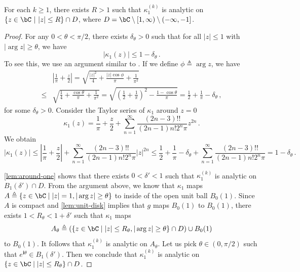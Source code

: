 \documentclass[11pt]{article}
\newcommand{\g}{\kappa_1}
\renewcommand{\i}{\mathbf{i}}
\begin{document}
\begin{lemma}\label{lem:analytic}
  
For each $k\geq 1$, there exists $R>1$ such that $\g^{(k)}$ is analytic on $\{z\in \bC~|~ |z|\le R\}\cap D$, where $D = \bC\setminus [1,\infty) \setminus (-\infty,-1] $.  
\end{lemma}

\begin{proof}
For any $0<\theta < \pi/2$, there exists $\delta_\theta>0$ such that for all $|z|\le 1$ with $|\arg z| \ge \theta$, we have \[
|\g(z)| \le 1 - \delta_\theta\,.
\]
To see this, we use an argument similar to \citep{pinelis}.
If 
we define $\phi \triangleq \arg z$, we have \begin{align*}
& \left| \frac{1}{\pi} + \frac{z}{2} \right| 
= \sqrt{\frac{|z|^2}{4}+\frac{|z| \cos \phi }{\pi }+\frac{1}{\pi ^2}}\\
\le{}& \sqrt{\frac{1}{4}+\frac{ \cos \theta}{\pi }+\frac{1}{\pi ^2}}
= \sqrt{\left(\frac{1}{2} + \frac{1}{\pi}\right)^2-\frac{1-\cos \theta}{\pi}}
= \frac{1}{2} + \frac{1}{\pi} - \delta_{\theta}
\,,
\end{align*}
for some $\delta_\theta>0$. 
Consider the Taylor series of $\g$ around $z=0$
\[
\g(z) = \frac{1}{\pi} + \frac{z}{2} + \sum_{n=1}^\infty \frac{(2n-3)!!}{(2n-1)n!2^n \pi} z^{2n}\,.
\]
We obtain \[
|\g(z)| \le \left|\frac{1}{\pi} + \frac{z}{2} \right| + \sum_{n=1}^\infty \frac{(2n-3)!!}{(2n-1)n!2^n \pi} |z|^{2n} \le \frac{1}{2} + \frac{1}{\pi}-\delta_\theta + \sum_{n=1}^\infty \frac{(2n-3)!!}{(2n-1)n!2^n \pi} = 1 - \delta_\theta\,.
\]

\cref{lem:around-one} shows that there exists $0<\delta'<1$ such that $\g^{(k)}$ is analytic on $B_1(\delta')\cap D$.
From the argument above, we know that $\g$ maps $ A\triangleq  \{z\in \bC \mid |z|=1,|\arg z|\ge \theta\}$ to inside of the open unit ball $B_0(1)$. Since $A$ is compact and \cref{lem:unit-disk} implies that $g$ maps $B_0(1)$ to $B_0(1)$, there exists $1< R_\theta < 1 + \delta'$ such that $\g$ maps 
\[
A_{\theta}\triangleq \left(\{z\in \bC\mid  |z|\le R_\theta, |\arg z| \ge \theta\} \cap D\right) \cup B_0(1)
\]
to $B_0(1)$. It follows that $\g^{(k)}$ is analytic on $A_\theta$. Let us pick $\theta \in (0,\pi/2)$ such that $ e^{\i\theta}\in B_1(\delta')$. Then we conclude that $\g^{(k)}$ is analytic on $\{z\in \bC \mid |z|\le R_\theta\}\cap D$. \end{proof}
\end{document}
